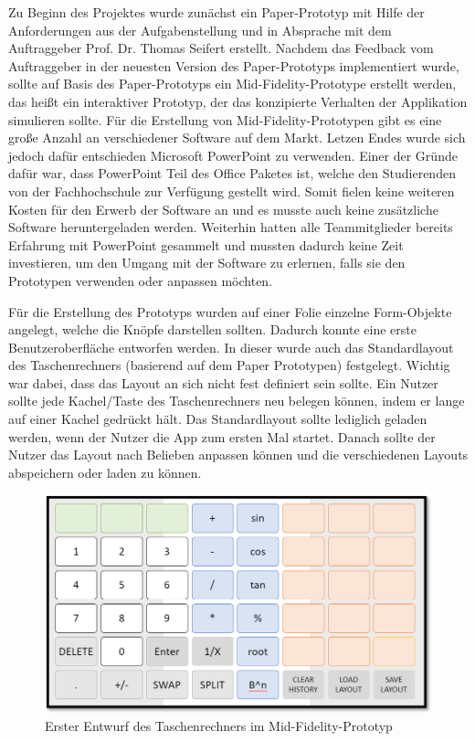 Zu Beginn des Projektes wurde zunächst ein Paper-Prototyp mit Hilfe der Anforderungen aus der Aufgabenstellung und in Absprache mit dem Auftraggeber Prof. Dr. Thomas Seifert erstellt. Nachdem das Feedback vom Auftraggeber in der neuesten Version des Paper-Prototyps implementiert wurde, sollte auf Basis des Paper-Prototyps ein Mid-Fidelity-Prototype erstellt werden, das heißt ein interaktiver Prototyp, der das konzipierte Verhalten der Applikation simulieren sollte. Für die Erstellung von Mid-Fidelity-Prototypen gibt es eine große Anzahl an verschiedener Software auf dem Markt. Letzen Endes wurde sich jedoch dafür entschieden Microsoft PowerPoint zu verwenden. Einer der Gründe dafür war, dass PowerPoint Teil des Office Paketes ist, welche den Studierenden von der Fachhochschule zur Verfügung gestellt wird. Somit fielen keine weiteren Kosten für den Erwerb der Software an und es musste auch keine zusätzliche Software heruntergeladen werden. Weiterhin hatten alle Teammitglieder bereits Erfahrung mit PowerPoint gesammelt und mussten dadurch keine Zeit investieren, um den Umgang mit der Software zu erlernen, falls sie den Prototypen verwenden oder anpassen möchten.  

Für die Erstellung des Prototyps wurden auf einer Folie einzelne Form-Objekte angelegt, welche die Knöpfe darstellen sollten. Dadurch konnte eine erste Benutzeroberfläche entworfen werden. In dieser wurde auch das Standardlayout des Taschenrechners (basierend auf dem Paper Prototypen) festgelegt. Wichtig war dabei, dass das Layout an sich nicht fest definiert sein sollte. Ein Nutzer sollte jede Kachel/Taste des Taschenrechners neu belegen können, indem er lange auf einer Kachel gedrückt hält. Das Standardlayout sollte lediglich geladen werden, wenn der Nutzer die App zum ersten Mal startet. Danach sollte der Nutzer das Layout nach Belieben anpassen können und die verschiedenen Layouts abspeichern oder laden zu können.  

\begin{figure}[!h]
	\includegraphics[scale=1]{img/erster-entwurf-mid-fidelty-prototyp}
	\caption[Erster Entwurf des Taschenrechners im Mid-Fidelity-Prototyp]{Erster Entwurf des Taschenrechners im Mid-Fidelity-Prototyp\footnotemark}
\end{figure}

